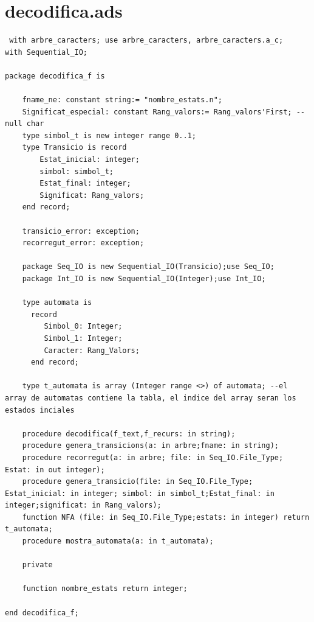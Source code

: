 \documentclass[a4paper,12pt]{article}
\begin{document}
\section{decodifica.ads}
\begin{lstlisting}
 with arbre_caracters; use arbre_caracters, arbre_caracters.a_c;
with Sequential_IO;

package decodifica_f is
	
	fname_ne: constant string:= "nombre_estats.n";
	Significat_especial: constant Rang_valors:= Rang_valors'First; --null char
	type simbol_t is new integer range 0..1;
	type Transicio is record
		Estat_inicial: integer;
		simbol: simbol_t;
		Estat_final: integer;
		Significat: Rang_valors;
	end record;
	
	transicio_error: exception;
	recorregut_error: exception;

	package Seq_IO is new Sequential_IO(Transicio);use Seq_IO;
	package Int_IO is new Sequential_IO(Integer);use Int_IO;
		
	type automata is			
      record
         Simbol_0: Integer;
         Simbol_1: Integer;
         Caracter: Rang_Valors;
      end record;

	type t_automata is array (Integer range <>) of automata; --el array de automatas contiene la tabla, el indice del array seran los estados inciales
	
	procedure decodifica(f_text,f_recurs: in string);
	procedure genera_transicions(a: in arbre;fname: in string);	
	procedure recorregut(a: in arbre; file: in Seq_IO.File_Type; Estat: in out integer);
	procedure genera_transicio(file: in Seq_IO.File_Type; Estat_inicial: in integer; simbol: in simbol_t;Estat_final: in integer;significat: in Rang_valors);
    function NFA (file: in Seq_IO.File_Type;estats: in integer) return t_automata;
    procedure mostra_automata(a: in t_automata);
    
    private 
    
    function nombre_estats return integer;

end decodifica_f;

\end{lstlisting}
\end{document}

